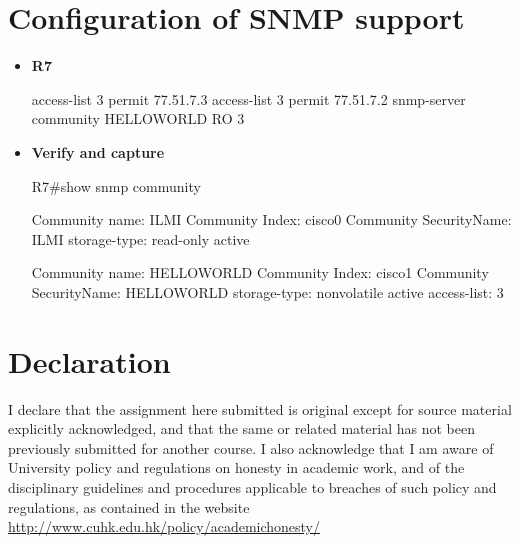 \documentclass[10pt]{article}
\begin{document}
\section{Configuration of SNMP support}
\begin{itemize}
\item {\bf R7}
\begin{verbatim*}
access-list 3 permit 77.51.7.3
access-list 3 permit 77.51.7.2
snmp-server community HELLOWORLD RO 3
\end{verbatim*}
\item {\bf Verify and capture}
\begin{verbatim*}
R7#show snmp community

Community name: ILMI
Community Index: cisco0
Community SecurityName: ILMI
storage-type: read-only  active


Community name: HELLOWORLD
Community Index: cisco1
Community SecurityName: HELLOWORLD
storage-type: nonvolatile        active access-list: 3
\end{verbatim*}
\end{itemize}
\newpage
\appendix
\section{Declaration}
I declare that the assignment here submitted is original except for source material explicitly acknowledged, and that the same or related material has not been previously submitted for another course. I also acknowledge that I am aware of University policy and regulations on honesty in academic work, and of the disciplinary guidelines and procedures applicable to breaches of such policy and regulations, as contained in the website \url{http://www.cuhk.edu.hk/policy/academichonesty/}
\vspace*{3cm}
\end{document}
